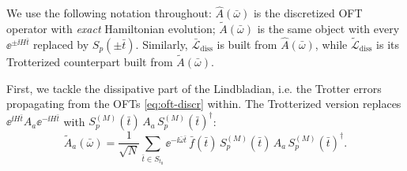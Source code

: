 We use the following notation throughout: $\hat{A}(\bar{\omega})$ is the discretized OFT operator with \emph{exact} Hamiltonian evolution; $\tilde{A}(\bar{\omega})$ is the same object with every $\ee^{\pm \ii H\bar{t}}$ replaced by $S_p(\pm \bar{t})$. Similarly, $\mathcal{\bar{L}}_\text{diss}$ is built from $\hat{A}(\bar{\omega})$, while $\mathcal{\tilde{L}}_\text{diss}$ is its Trotterized counterpart built from $\tilde{A}(\bar{\omega})$.

First, we tackle the dissipative part of the Lindbladian, i.e. the Trotter errors propagating from the OFTs \eqref{eq:oft-discr} within. The Trotterized version replaces $\ee^{\ii H\bar{t}} A_a \ee^{-\ii H\bar{t}}$ with $S_p^{(M)}(\bar{t})\, A_a\, S_p^{(M)}(\bar{t})^\dagger$:
\begin{equation} \label{eq:trotter-oft}
    \tilde{A}_a(\bar{\omega})
    = \frac{1}{\sqrt{N}} \sum_{\bar{t} \in S_{t_0}} \ee^{-\ii\bar{\omega}\bar{t}}\, \bar{f}(\bar{t})\, S_p^{(M)}(\bar{t})\, A_a\, S_p^{(M)}(\bar{t})^\dagger.
\end{equation}


